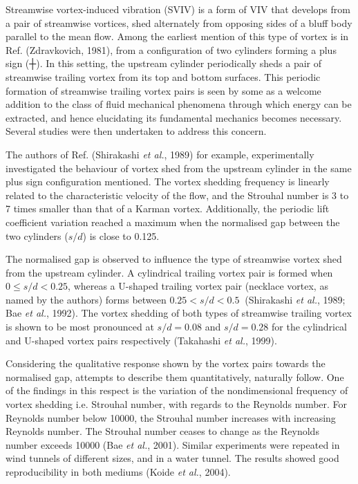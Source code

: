 \documentclass[]{article}
\begin{document}
\protect\hypertarget{_Hlk525229690}{}{}Streamwise vortex-induced
vibration (SVIV) is a form of VIV that develops from a pair of
streamwise vortices, shed alternately from opposing sides of a bluff
body parallel to the mean flow. Among the earliest mention of this type
of vortex is in Ref. (Zdravkovich, 1981), from a configuration of two
cylinders forming a plus sign (┼). In this setting, the upstream
cylinder periodically sheds a pair of streamwise trailing vortex from
its top and bottom surfaces. This periodic formation of streamwise
trailing vortex pairs is seen by some as a welcome addition to the class
of fluid mechanical phenomena through which energy can be extracted, and
hence elucidating its fundamental mechanics becomes necessary. Several
studies were then undertaken to address this concern.

The authors of Ref. (Shirakashi \emph{et al.}, 1989) for example,
experimentally investigated the behaviour of vortex shed from the
upstream cylinder in the same plus sign configuration mentioned. The
vortex shedding frequency is linearly related to the characteristic
velocity of the flow, and the Strouhal number is 3 to 7 times smaller
than that of a Karman vortex. Additionally, the periodic lift
coefficient variation reached a maximum when the normalised gap between
the two cylinders (\(s/d\)) is close to 0.125.

The normalised gap is observed to influence the type of streamwise
vortex shed from the upstream cylinder. A cylindrical trailing vortex
pair is formed when \(0 \leq s/d < 0.25\), whereas a U-shaped trailing
vortex pair (necklace vortex, as named by the authors) forms between
\(0.25 < s/d < 0.5\ \) (Shirakashi \emph{et al.}, 1989; Bae \emph{et
al.}, 1992). The vortex shedding of both types of streamwise trailing
vortex is shown to be most pronounced at \(s/d = 0.08\) and
\(s/d = 0.28\) for the cylindrical and U-shaped vortex pairs
respectively (Takahashi \emph{et al.}, 1999).

Considering the qualitative response shown by the vortex pairs towards
the normalised gap, attempts to describe them quantitatively, naturally
follow. One of the findings in this respect is the variation of the
nondimensional frequency of vortex shedding i.e. Strouhal number, with
regards to the Reynolds number. For Reynolds number below 10000, the
Strouhal number increases with increasing Reynolds number. The Strouhal
number ceases to change as the Reynolds number exceeds 10000 (Bae
\emph{et al.}, 2001). Similar experiments were repeated in wind tunnels
of different sizes, and in a water tunnel. The results showed good
reproducibility in both mediums (Koide \emph{et al.}, 2004).
\end{document}
